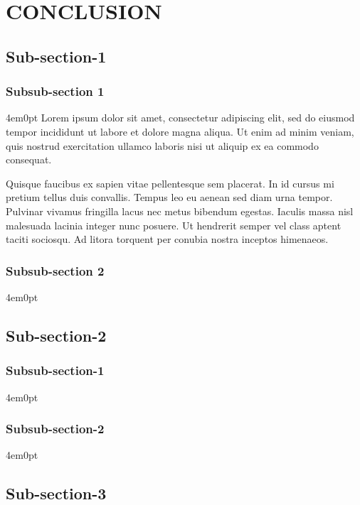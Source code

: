 \renewcommand{\thechapter}{\Roman{chapter}}
\chapter[]{CONCLUSION}
\renewcommand{\thechapter}{\arabic{chapter}}
\begingroup
\fontsize{12pt}{\baselineskip}\selectfont
\section{Sub-section-1}

\subsection{Subsub-section 1}
\begin{indentedblock}{4em}{0pt}
	Lorem ipsum dolor sit amet, consectetur adipiscing elit, sed do eiusmod tempor incididunt ut labore et dolore magna aliqua. Ut enim ad minim veniam, quis nostrud exercitation ullamco laboris nisi ut aliquip ex ea commodo consequat. 
	
	
	Quisque faucibus ex sapien vitae pellentesque sem placerat. In id cursus mi pretium tellus duis convallis. Tempus leo eu aenean sed diam urna tempor. Pulvinar vivamus fringilla lacus nec metus bibendum egestas. Iaculis massa nisl malesuada lacinia integer nunc posuere. Ut hendrerit semper vel class aptent taciti sociosqu. Ad litora torquent per conubia nostra inceptos himenaeos.
\end{indentedblock}
\subsection{Subsub-section 2}
\begin{indentedblock}{4em}{0pt}
\end{indentedblock}
\section{Sub-section-2}

\subsection{Subsub-section-1}
\begin{indentedblock}{4em}{0pt}
\end{indentedblock}
\subsection{Subsub-section-2}
\begin{indentedblock}{4em}{0pt}
\end{indentedblock}

\section{Sub-section-3}
\endgroup
